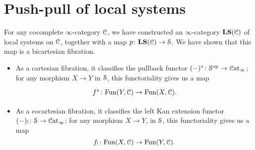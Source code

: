 \documentclass[main.tex]{subfiles}
\begin{document}
\section{Push-pull of local systems}
\label{sec:the_non_monoidal_construction}

For any cocomplete $\infty$-category $\category{C}$, we have constructed an $\infty$-category $\LS(\category{C})$ of local systems on $\category{C}$, together with a map $p\colon \LS(\category{C}) \to \S$. We have shown that this map is a bicartesian fibration.
\begin{itemize}
  \item As a cartesian fibration, it classifies the pullback functor $(-)^{*}\colon \S\op \to \ICat$; for any morphism $X \to Y$ in $\S$, this functoriality gives us a map
    \begin{equation*}
      \begin{tikzcd}
        f^{*}\colon \Fun(Y, \category{C}) \to \Fun(X, \category{C}).
      \end{tikzcd}
    \end{equation*}

  \item As a cocartesian fibration, it classifies the left Kan extension functor $(-)_{!}\colon \S \to \ICat$; for any morphism $X \to Y$, in $\S$, this functoriality gives us a map
    \begin{equation*}
      f_{!}\colon \Fun(X, \category{C}) \to \Fun(Y, \category{C}).
    \end{equation*}
\end{itemize}
\end{document}
